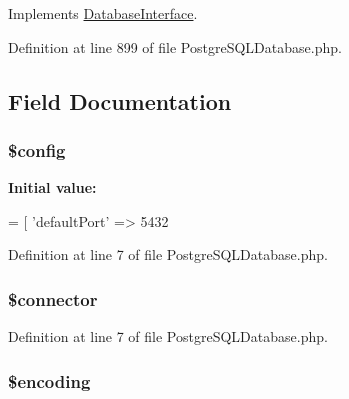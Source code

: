 Implements \hyperlink{interface_database_interface_ae7cdaa744d52a1eb0103e377023ca528}{Database\+Interface}.



Definition at line 899 of file Postgre\+S\+Q\+L\+Database.\+php.



\subsection{Field Documentation}
\hypertarget{class_postgre_s_q_l_database_a49c7011be9c979d9174c52a8b83e5d8e}{}
\subsubsection[{\$config}]{\setlength{\rightskip}{0pt plus 5cm}\$config\hspace{0.3cm}{\ttfamily [protected]}}\label{class_postgre_s_q_l_database_a49c7011be9c979d9174c52a8b83e5d8e}
{\bfseries Initial value\+:}
\begin{DoxyCode}
= [
        \textcolor{stringliteral}{'defaultPort'} => 5432
\end{DoxyCode}


Definition at line 7 of file Postgre\+S\+Q\+L\+Database.\+php.

\hypertarget{class_postgre_s_q_l_database_a7c7a1968b87fd4d016e364b27b7a3d7d}{}
\subsubsection[{\$connector}]{\setlength{\rightskip}{0pt plus 5cm}\$connector\hspace{0.3cm}{\ttfamily [protected]}}\label{class_postgre_s_q_l_database_a7c7a1968b87fd4d016e364b27b7a3d7d}


Definition at line 7 of file Postgre\+S\+Q\+L\+Database.\+php.

\hypertarget{class_postgre_s_q_l_database_aee271b7ce67fbe00b9976e6c347cbfbf}{}
\subsubsection[{\$encoding}]{\setlength{\rightskip}{0pt plus 5cm}\$encoding\hspace{0.3cm}{\ttfamily [protected]}}\label{class_postgre_s_q_l_database_aee271b7ce67fbe00b9976e6c347cbfbf}


